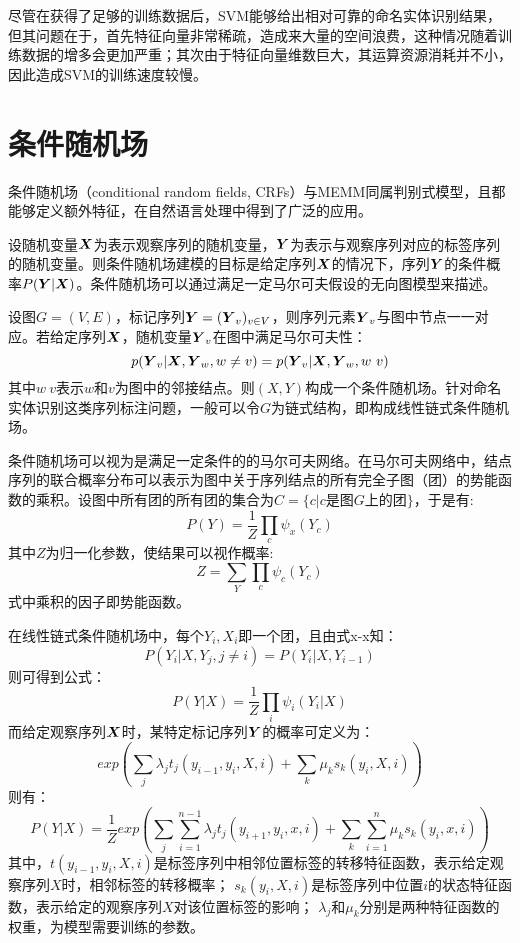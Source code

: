 尽管在获得了足够的训练数据后，SVM能够给出相对可靠的命名实体识别结果，但其问题在于，首先特征向量非常稀疏，造成来大量的空间浪费，这种情况随着训练数据的增多会更加严重；其次由于特征向量维数巨大，其运算资源消耗并不小，因此造成SVM的训练速度较慢。

\section{条件随机场}
条件随机场（conditional random fields, CRFs）与MEMM同属判别式模型，且都能够定义额外特征，在自然语言处理中得到了广泛的应用。

设随机变量$\boldsymbol{X}$为表示观察序列的随机变量，$\boldsymbol{Y}$为表示与观察序列对应的标签序列的随机变量。则条件随机场建模的目标是给定序列$\boldsymbol{X}$的情况下，序列$\boldsymbol{Y}$的条件概率$P(\boldsymbol{Y}|\boldsymbol{X})$。条件随机场可以通过满足一定马尔可夫假设的无向图模型来描述。

设图$G=(V,E)$，标记序列$\boldsymbol{Y} = (\boldsymbol{Y}_v)_{v\in V}$，则序列元素$\boldsymbol{Y}_v$与图中节点一一对应。若给定序列$\boldsymbol{X}$，随机变量$\boldsymbol{Y}_v$在图中满足马尔可夫性：
\begin{equation}
    p(\boldsymbol{Y}_v|\boldsymbol{X}, \boldsymbol{Y}_w, w\neq v) = p(\boldsymbol{Y}_v|\boldsymbol{X},\boldsymbol{Y}_w,w~v)
\end{equation}
其中$w~v$表示$w$和$v$为图中的邻接结点。则$(X, Y)$构成一个条件随机场。针对命名实体识别这类序列标注问题，一般可以令$G$为链式结构，即构成线性链式条件随机场。

条件随机场可以视为是满足一定条件的的马尔可夫网络。在马尔可夫网络中，结点序列的联合概率分布可以表示为图中关于序列结点的所有完全子图（团）的势能函数的乘积。设图中所有团的所有团的集合为$C = \{c|c$是图$G$上的团$\}$，于是有:
\begin{equation}
    P(Y) = \dfrac{1}{Z}\prod_{c}\psi_x(Y_c)
\end{equation}
其中$Z$为归一化参数，使结果可以视作概率:
\begin{equation}
    Z = \sum_Y\prod_c \psi_c(Y_c)
\end{equation}
式中乘积的因子即势能函数。

在线性链式条件随机场中，每个${Y_i, X_i}$即一个团，且由式x-x知：
\begin{equation}
    P(Y_i|X, Y_j, j\neq i) = P(Y_i|X, Y_{i-1})
\end{equation}
则可得到公式：
\begin{equation}
    P(Y|X) = \dfrac{1}{Z}\prod_i\psi_i(Y_i|X)
\end{equation}
而给定观察序列$\boldsymbol{X}$时，某特定标记序列$\boldsymbol{Y}$的概率可定义为：
\begin{equation}
    exp(\sum_j\lambda_j t_j(y_{i-1}, y_i, X, i) + \sum_k \mu_k s_k(y_i, X, i))
\end{equation}
则有：
\begin{equation}
    P(Y|X) = \dfrac{1}{Z}exp(\sum_j\sum_{i=1}^{n-1}\lambda_j t_j(y_{i+1}, y_i, x, i) + \sum_k\sum_{i=1}^{n}\mu_k s_k(y_i, x, i))
\end{equation}
其中，$t(y_{i-1}, y_i, X, i)$是标签序列中相邻位置标签的转移特征函数，表示给定观察序列$X$时，相邻标签的转移概率；
$s_k(y_i, X, i)$是标签序列中位置$i$的状态特征函数，表示给定的观察序列$X$对该位置标签的影响；
$\lambda_j$和$\mu_k$分别是两种特征函数的权重，为模型需要训练的参数。

